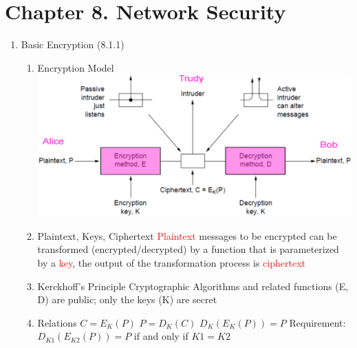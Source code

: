 \documentclass[a4paper,10pt]{article}
\newcommand{\red}[1]{\textcolor{red}{#1}}
\begin{document}
\newpage\section*{Chapter 8. Network Security}
\begin{enumerate}
  \item Basic Encryption (8.1.1)
    \begin{enumerate}
      \item Encryption Model
        \newline\includegraphics[width=\textwidth]{encryption}
      \item Plaintext, Keys, Ciphertext
        \newline \red{Plaintext} messages to be encrypted can be transformed (encrypted/decrypted) by a function that is parameterized by a \red{key}, the output of the transformation process is \red{ciphertext}
      \item Kerckhoff's Principle
        \newline Cryptographic Algorithms and related functions (E, D) are public; only the keys (K) are secret
      \item Relations
        \newline $ C = E_K(P) $
        \newline $ P = D_K(C) $
        \newline $ D_K(E_K(P)) = P $
        \newline Requirement: $ D_{K1}(E_{K2}(P)) = P $ if and only if $ K1 = K2 $
    \end{enumerate}
    

\end{enumerate}
\end{document}
